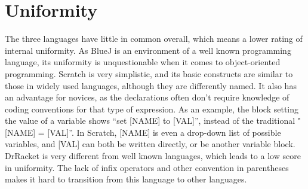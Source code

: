 \section{Uniformity}
\label{sec:uniformity}

The three languages have little in common overall, which means a lower rating of internal uniformity. As BlueJ is an environment of a well known programming language, its uniformity is unquestionable when it comes to object-oriented programming. Scratch is very simplistic, and its basic constructs are similar to those in widely used languages, although they are differently named. It also has an advantage for novices, as the declarations often don't require knowledge of coding conventions for that type of expression. As an example, the block setting the value of a variable shows ``set [NAME] to [VAL]'', instead of the traditional "[NAME] = [VAL]''. In Scratch, [NAME] is even a drop-down list of possible variables, and [VAL] can both be written directly, or be another variable block. DrRacket is very different from well known languages, which leads to a low score in uniformity. The lack of infix operators and other convention in parentheses makes it hard to transition from this language to other languages.